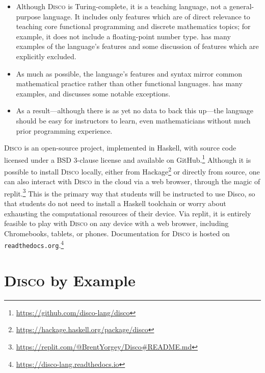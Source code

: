 \documentclass[submission,copyright,creativecommons]{eptcs}
\newcommand{\disco}{\textsc{Disco}\xspace}
\newcommand{\pref}[1]{\prettyref{#1}}
\begin{document}
\begin{itemize}
\item Although \disco is Turing-complete, it is a teaching language,
  not a general-purpose language.  It includes only features which are
  of direct relevance to teaching core functional programming and
  discrete mathematics topics; for example, it does not include a
  floating-point number type.  \pref{sec:examples} has many examples
  of the language's features and some discussion of features which are
  explicitly excluded.
\item As much as possible, the language's features and syntax mirror
  common mathematical practice rather than other functional languages.
  \pref{sec:examples} has many examples, and \pref{sec:syntax} discusses
  some notable exceptions.
\item As a result---although there is as yet no data to back this
  up---the language should be easy for instructors to learn, even
  mathematicians without much prior programming experience.
\end{itemize}

\disco is an open-source project, implemented in Haskell, with source
code licensed under a BSD 3-clause license and available on
GitHub.\footnote{\url{https://github.com/disco-lang/disco}} Although
it is possible to install \disco locally, either from
Hackage\footnote{\url{https://hackage.haskell.org/package/disco}} or
directly from source, one can also interact with \disco in the cloud
via a web browser, through the magic of
replit.\footnote{\url{https://replit.com/@BrentYorgey/Disco\#README.md}}
This is the primary way that students will be instructed to use Disco,
so that students do not need to install a Haskell toolchain or worry
about exhausting the computational resources of their device.  Via
replit, it is entirely feasible to play with \disco on any device with
a web browser, including Chromebooks, tablets, or phones.
Documentation for \disco is hosted on
\texttt{readthedocs.org}.\footnote{\url{https://disco-lang.readthedocs.io}}


\section{\disco by Example}
\label{sec:examples}
\end{document}

